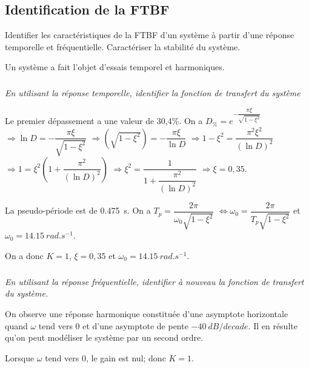 \documentclass[10pt,fleqn]{article} %
\begin{document}
\def\pathfig{images}

\vspace{4cm}
\pagestyle{fancy}
\thispagestyle{plain}

\def\columnseprulecolor{\color{ocre}}
\setlength{\columnseprule}{0.4pt} 

\def\pathfig{images}

\ifprof
\else
\begin{multicols}{2}
\fi
\subsection*{Identification de la FTBF}
\begin{obj}
Identifier les caractéristiques de la FTBF d'un système à partir d'une réponse temporelle et fréquentielle. Caractériser la stabilité du système.
\end{obj}


Un système a fait l’objet d’essais temporel et harmoniques.


\subparagraph{}\textit{En utilisant la réponse temporelle, identifier la fonction de transfert du système}
\ifprof
\begin{corrige}
Le premier dépassement a une valeur de 30,4\%. On a
$D_\%=e^{-\dfrac{\pi \xi}{\sqrt{1-\xi^2}}}$
$\Rightarrow \ln D = -\dfrac{\pi \xi}{\sqrt{1-\xi^2}}$
$\Rightarrow \left( \sqrt{1-\xi^2} \right)  = -\dfrac{\pi \xi}{\ln D}$
$\Rightarrow 1-\xi^2= \dfrac{\pi^2 \xi^2}{\left(\ln D\right)^2}$
$\Rightarrow 1= \xi^2\left( 1+\dfrac{\pi^2 }{\left(\ln D\right)^2}\right)$
$\Rightarrow \xi^2= \dfrac{1}{ 1+\dfrac{\pi^2 }{\left(\ln D\right)^2}}$
$\Rightarrow \xi=0,35$.

La pseudo-période est de \SI{0,475}{s}. On a  $T_p=\dfrac{2\pi}{\omega_0\sqrt{1-\xi^2}}$
$\Leftrightarrow \omega_0=\dfrac{2\pi}{T_p\sqrt{1-\xi^2}}$ et $\omega_0=\SI{14,15}{rad.s^{-1}}$.
 
 On a donc $K=1$, $\xi=0,35$ et $\omega_0=\SI{14,15}{rad.s^{-1}}$.
\end{corrige}
\else
\fi

\subparagraph{}\textit{En utilisant la réponse fréquentielle, identifier à nouveau la fonction de transfert du système.}
\ifprof
\begin{corrige}
On observe une réponse harmonique constituée d'une asymptote horizontale quand $\omega$ tend vers 0 et d'une asymptote de pente $-\SI{40}{dB/decade}$. Il en résulte qu'on peut modéliser le système par un second ordre. 

Lorsque $\omega$ tend vers 0, le gain est nul; donc $K=1$.


\end{corrige}
\end{multicols}
\end{document}
